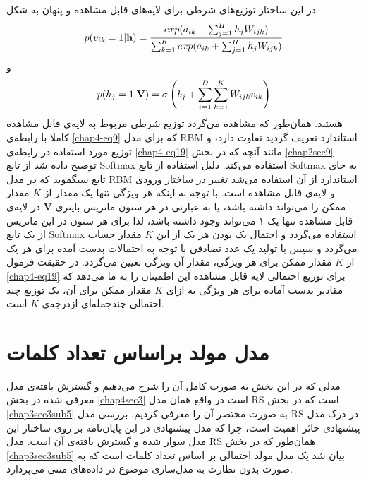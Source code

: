در این ساختار توزیع‌های شرطی برای لایه‌های قابل مشاهده و پنهان به شکل
\begin{align}
	\centering
	\label{chap4-eq19}
	p(v_{ik}=1|\textbf{h})=\dfrac{exp(a_{ik}+\sum_{j=1}^{H}h_jW_{ijk})}{\sum_{k=1}^{K}exp(a_{ik}+\sum_{j=1}^{H}h_jW_{ijk})}
\end{align}
و
\begin{align}
	\centering
	\label{chap4-eq20}
	p(h_{j}=1|\textbf{V})=\sigma \left( b_j +  \sum_{i=1}^{D}\sum_{k=1}^{K}W_{ijk}v_{ik} \right)
\end{align}
هستند. همان‌طور که مشاهده می‌‌گردد توزیع شرطی مربوط به لایه‌ی قابل مشاهده کاملا با رابطه‌ی
\ref{chap4-eq9}
که برای مدل
RBM
استاندارد تعریف گردید تفاوت دارد، و توزیع مورد استفاده در رابطه‌ی
\ref{chap4-eq19}
 مانند آنچه که در بخش
\ref{chap2sec9}
توضیح داده شد از تابع
Softmax
استفاده می‌‌کند. دلیل استفاده از تابع
Softmax
به جای تابع سیگموید که در مدل
RBM
استاندارد از آن استفاده می‌‌شد تغییر در ساختار ورودی و لایه‌ی قابل مشاهده است. با توجه به اینکه هر ویژگی‌ تنها یک مقدار از
$K$
مقدار ممکن را می‌‌تواند داشته باشد، یا به عبارتی در هر ستون ماتریس باینری
$\textbf{V}$
 در لایه‌ی قابل مشاهده تنها یک ۱ می‌‌تواند وجود داشته باشد، لذا برای هر ستون در این ماتریس از یک تابع
Softmax
استفاده می‌گردد و احتمال یک بودن هر یک از این
$K$
 مقدار حساب می‌گردد و سپس با تولید یک عدد تصادفی با توجه به احتمالات بدست آمده برای هر یک از
$K$
مقدار ممکن برای هر ویژگی‌، مقدار آن ویژگی‌ تعیین می‌‌گردد. در حقیقت فرمول
\ref{chap4-eq19}
برای توزیع احتمالی‌ لایه قابل مشاهده این اطمینان را به ما می‌دهد که مقادیر بدست آماده برای هر ویژگی‌ به ازای
$K$
مقدار ممکن برای آن، یک توزیع چند احتمالی‌ چندجمله‌ای ازدرجه‌ی
$K$
است.



\section{مدل مولد براساس تعداد کلمات}
\label{chap4sec4}

مدلی‌ که در این بخش به صورت کامل آن را شرح می‌‌دهیم و گسترش یافته‌ی مدل معرفی‌ شده در بخش
\ref{chap4sec3}
است در واقع همان مدل
RS
 است که در بخش
\ref{chap3sec3sub5}
به صورت مختصر آن را معرفی‌ کردیم. بررسی‌ مدل
RS
در درک مدل پیشنهادی حائز اهمیت است، چرا که مدل پیشنهادی در این پایان‌‌نامه بر روی ساختار این مدل سوار شده و گسترش یافته‌ی آن است. مدل
RS
 همان‌طور که در بخش
\ref{chap3sec3sub5}
بیان شد یک مدل مولد احتمالی‌ بر اساس تعداد کلمات است که به صورت بدون نظارت به مدل‌سازی موضوع در داده‌های متنی می‌‌پردازد.

